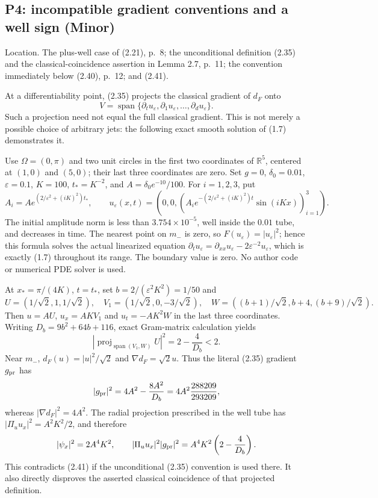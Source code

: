 \documentclass[10pt]{article}
\begin{document}
\subsection*{P4: incompatible gradient conventions and a well sign (Minor)}
Location. The plus-well case of (2.21), p. 8; the unconditional definition (2.35) and the classical-coincidence assertion in Lemma 2.7, p. 11; the convention immediately below (2.40), p. 12; and (2.41).\par
At a differentiability point, (2.35) projects the classical gradient of \(d_F\) onto \[V=\operatorname{span}\{\partial_tu_\varepsilon,\partial_1u_\varepsilon,
                  \ldots,\partial_du_\varepsilon\}.\] Such a projection need not equal the full classical gradient. This is not merely a possible choice of arbitrary jets: the following exact smooth solution of (1.7) demonstrates it.\par
Use \(\Omega=(0,\pi)\) and two unit circles in the first two coordinates of \(\mathbb R^5\), centered at \((1,0)\) and \((5,0)\); their last three coordinates are zero. Set \(g=0\), \(\delta_0=0.01\), \(\varepsilon=0.1\), \(K=100\), \(t_*=K^{-2}\), and \(A=\delta_0 e^{-10}/100\). For \(i=1,2,3\), put \[A_i=Ae^{(2/\varepsilon^2+(iK)^2)t_*},\qquad
 u_\varepsilon(x,t)=
 \left(0,0,\left(A_i e^{-(2/\varepsilon^2+(iK)^2)t}\sin(iKx)\right)_{i=1}^3\right).\] The initial amplitude norm is less than \(3.754\times10^{-5}\), well inside the \(0.01\) tube, and decreases in time. The nearest point on \(m_-\) is zero, so \(F(u_\varepsilon)=|u_\varepsilon|^2\); hence this formula solves the actual linearized equation \(\partial_tu_\varepsilon=\partial_{xx}u_\varepsilon-2\varepsilon^{-2}u_\varepsilon\), which is exactly (1.7) throughout its range. The boundary value is zero. No author code or numerical PDE solver is used.\par
At \(x_*=\pi/(4K)\), \(t=t_*\), set \(b=2/(\varepsilon^2K^2)=1/50\) and \[U=(1/\sqrt2,1,1/\sqrt2),\quad
 V_1=(1/\sqrt2,0,-3/\sqrt2),\quad
 W=((b+1)/\sqrt2,b+4,(b+9)/\sqrt2).\] Then \(u=AU\), \(u_x=AKV_1\) and \(u_t=-AK^2W\) in the last three coordinates. Writing \(D_b=9b^2+64b+116\), exact Gram-matrix calculation yields \[|\operatorname{proj}_{\operatorname{span}(V_1,W)}U|^2
       =2-\frac4{D_b}<2.\] Near \(m_-\), \(d_F(u)=|u|^2/\sqrt2\) and \(\nabla d_F=\sqrt2u\). Thus the literal (2.35) gradient \(g_{\rm pr}\) has \[|g_{\rm pr}|^2=4A^2-\frac{8A^2}{D_b}
     =4A^2\frac{288209}{293209},\] whereas \(|\nabla d_F|^2=4A^2\). The radial projection prescribed in the well tube has \(|\Pi_u u_x|^2=A^2K^2/2\), and therefore \[|\psi_x|^2=2A^4K^2,\qquad
 |\Pi_u u_x|^2|g_{\rm pr}|^2
   =A^4K^2\left(2-\frac4{D_b}\right).\] This contradicts (2.41) if the unconditional (2.35) convention is used there. It also directly disproves the asserted classical coincidence of that projected definition.\par
\end{document}
